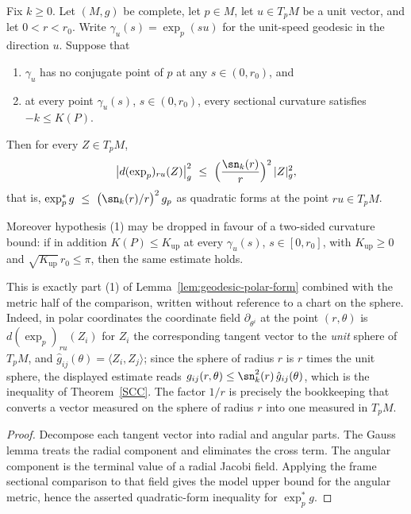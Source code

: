 \begin{lemma}
\label{lem:exp-pullback-metric-comparison}
\leanok



Fix $k\ge0$. Let $(M,g)$ be complete, let $p\in M$, let $u\in T_pM$ be a unit
vector, and let $0<r<r_0$. Write $\gamma_u(s)=\exp_p(su)$ for the unit-speed
geodesic in the direction $u$. Suppose that
\begin{enumerate}
\item $\gamma_u$ has no conjugate point of $p$ at any $s\in(0,r_0)$, and
\item at every point $\gamma_u(s)$, $s\in(0,r_0)$, every sectional curvature
satisfies $-k\le K(P)$.
\end{enumerate}
Then for every $Z\in T_pM$,
$$\bigl|d(\exp_p)_{ru}(Z)\bigr|_g^2\ \le\
\Bigl(\frac{\sn_{k}(r)}{r}\Bigr)^{2}\,|Z|_g^2,$$
that is, $\exp_p^{*}g\ \le\ \bigl(\sn_{k}(r)/r\bigr)^{2}\,g_p$ as quadratic
forms at the point $ru\in T_pM$.

Moreover hypothesis (1) may be dropped in favour of a two-sided curvature
bound: if in addition $K(P)\le K_{\mathrm{up}}$ at every $\gamma_u(s)$,
$s\in[0,r_0]$, with $K_{\mathrm{up}}\ge0$ and
$\sqrt{K_{\mathrm{up}}}\,r_0\le\pi$, then the same estimate holds.
\end{lemma}

This is exactly part (1) of Lemma~\ref{lem:geodesic-polar-form} combined with
the metric half of the comparison, written without reference to a chart on the
sphere. Indeed, in polar coordinates the coordinate field
$\partial_{\theta^i}$ at the point $(r,\theta)$ is $d(\exp_p)_{ru}(Z_i)$ for
$Z_i$ the corresponding tangent vector to the \emph{unit} sphere of $T_pM$, and
$\hat g_{ij}(\theta)=\langle Z_i,Z_j\rangle$; since the sphere of radius $r$ is
$r$ times the unit sphere, the displayed estimate reads
$g_{ij}(r,\theta)\le\sn_k^2(r)\,\hat g_{ij}(\theta)$, which is the inequality
of Theorem~\ref{SCC}. The factor $1/r$ is precisely the bookkeeping that
converts a vector measured on the sphere of radius $r$ into one measured in
$T_pM$.

\begin{proof}
\sketch
{}
\leanok
Decompose each tangent vector into radial and angular parts. The Gauss lemma treats the radial component and eliminates the cross term. The angular component is the terminal value of a radial Jacobi field. Applying the frame sectional comparison to that field gives the model upper bound for the angular metric, hence the asserted quadratic-form inequality for $\exp_p^*g$.
\end{proof}

